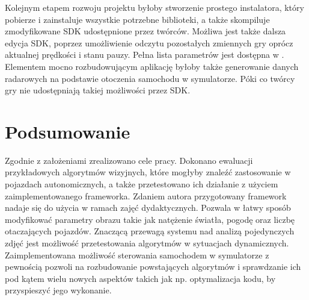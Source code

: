 Kolejnym etapem rozwoju projektu byłoby stworzenie prostego instalatora, który pobierze i zainstaluje wszystkie potrzebne biblioteki, a także skompiluje zmodyfikowane SDK udostępnione przez twórców. 
Możliwa jest także dalsza edycja SDK, poprzez umożliwienie odczytu pozostałych zmiennych gry oprócz aktualnej prędkości i stanu pauzy. 
Pełna lista parametrów jest dostępna w \cite{S3}. 
Elementem mocno rozbudowującym aplikację byłoby także generowanie danych radarowych na podstawie otoczenia samochodu w symulatorze. 
Póki co twórcy gry nie udostępniają takiej możliwości przez SDK.


\chapter{Podsumowanie}
Zgodnie z założeniami zrealizowano cele pracy. 
Dokonano ewaluacji przykładowych algorytmów wizyjnych, które mogłyby znaleźć zastosowanie w pojazdach autonomicznych, a także przetestowano ich działanie z użyciem zaimplementowanego frameworka. %
Zdaniem autora przygotowany framework nadaje się do użycia w ramach zajęć dydaktycznych.
Pozwala w łatwy sposób modyfikować parametry obrazu takie jak natężenie światła, pogodę oraz liczbę otaczających pojazdów. 
Znaczącą przewagą systemu nad analizą pojedynczych zdjęć jest możliwość przetestowania algorytmów w sytuacjach dynamicznych. 
Zaimplementowana możliwość sterowania samochodem w symulatorze z pewnością pozwoli na rozbudowanie powstających algorytmów i sprawdzanie ich pod kątem wielu nowych aspektów takich jak np. optymalizacja kodu, by przyspieszyć jego wykonanie.


